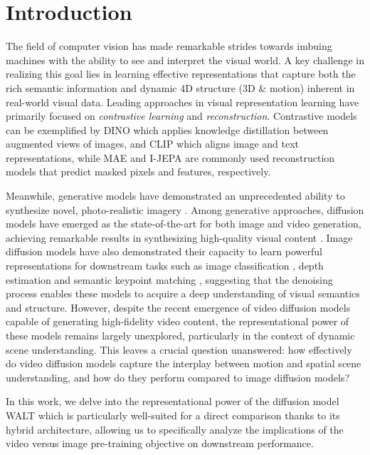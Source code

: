 \section{Introduction}
\label{sec:intro}

The field of computer vision has made remarkable strides towards imbuing machines with the ability to see and interpret the visual world.
A key challenge in realizing this goal lies in learning effective representations that capture both the rich semantic information and dynamic 4D structure (3D \& motion) inherent in real-world visual data.
Leading approaches in visual representation learning have primarily focused on \emph{contrastive learning} and \emph{reconstruction}.
Contrastive models can be exemplified by DINO \cite{caron2021emerging} which applies knowledge distillation between augmented views of images, and CLIP \cite{radford2021} which aligns image and text representations, while MAE \cite{mae} and I-JEPA \cite{ijepa} are commonly used reconstruction models that predict masked pixels and features, respectively.



Meanwhile, generative models have demonstrated an unprecedented ability to synthesize novel, photo-realistic imagery \cite{karras2022elucidating, liu2024sora}.
Among generative approaches, diffusion models \cite{HoDenoisingDiffusionProbabilisticModels} have emerged as the state-of-the-art for both image and video generation, achieving remarkable results in synthesizing high-quality visual content \cite{fuest2024diffusion}.
Image diffusion models have also demonstrated their capacity to learn powerful representations for downstream tasks such as image classification \cite{li2023your}, depth estimation \cite{shao2023monodiffusion} and semantic keypoint matching \cite{hedlin2024unsupervised, tang2023}, suggesting that the denoising process enables these models to acquire a deep understanding of visual semantics and structure.
However, despite the recent emergence of video diffusion models capable of generating high-fidelity video content, the representational power of these models remains largely unexplored, particularly in the context of dynamic scene understanding.
This leaves a crucial question unanswered: how effectively do video diffusion models capture the interplay between motion and spatial scene understanding, and how do they perform compared to image diffusion models?

\clearpage
In this work, we delve into the representational power of the diffusion model WALT \cite{walt} which is particularly well-suited for a direct comparison thanks to its hybrid architecture, allowing us to specifically analyze the implications of the video versus image pre-training objective on downstream performance.

